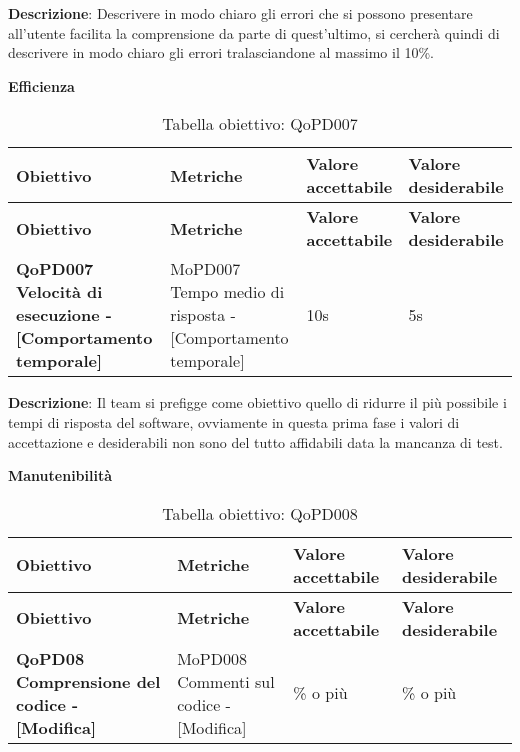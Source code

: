 \documentclass[../piano-di-qualifica.tex]{subfiles}
\begin{document}
\textbf{Descrizione}: Descrivere in modo chiaro gli errori che si possono presentare all'utente facilita la comprensione da parte di quest'ultimo, si cercherà quindi di descrivere in modo chiaro gli errori tralasciandone al massimo il 10\%.


    \begin{center}
        \centering
        \textbf{Efficienza}
    \end{center}

    \renewcommand{\arraystretch}{2} %
    \begin{longtable}[H]{>{\centering\bfseries}m{5cm} >{\centering}m{5cm} >{\centering}m{2.5cm} >{\centering\arraybackslash}m{2.5cm}}  
        \caption{Tabella obiettivo: QoPD007}%
        \label{tab:obiettivo_qopd007} \\
      \rowcolor{lightgray}
      {\textbf{Obiettivo}} & {\textbf{Metriche}} & {\textbf{Valore accettabile}} & {\textbf{Valore desiderabile}}  \\
      \endfirsthead%
      \rowcolor{lightgray}
      {\textbf{Obiettivo}} & {\textbf{Metriche}} & {\textbf{Valore accettabile}} & {\textbf{Valore desiderabile}}  \\
      \endhead%
      \textbf{QoPD007 Velocità di esecuzione - {[}Comportamento temporale{]}} & MoPD007 Tempo medio di risposta - {[}Comportamento temporale{]} & 10s & 5s \\
    \end{longtable}
    
    \textbf{Descrizione}: Il team si prefigge come obiettivo quello di ridurre il più possibile i tempi di risposta del software, ovviamente in questa prima fase i valori di accettazione e desiderabili non sono del tutto affidabili data la mancanza di test.    
        
    \begin{center}
        \centering
        \textbf{Manutenibilità}
    \end{center}

    \renewcommand{\arraystretch}{2} %
    \begin{longtable}[H]{>{\centering\bfseries}m{5cm} >{\centering}m{5cm} >{\centering}m{2.5cm} >{\centering\arraybackslash}m{2.5cm}}  
        \caption{Tabella obiettivo: QoPD008}%
        \label{tab:obiettivo_qopd008} \\
      \rowcolor{lightgray}
      {\textbf{Obiettivo}} & {\textbf{Metriche}} & {\textbf{Valore accettabile}} & {\textbf{Valore desiderabile}}  \\
      \endfirsthead%
      \rowcolor{lightgray}
      {\textbf{Obiettivo}} & {\textbf{Metriche}} & {\textbf{Valore accettabile}} & {\textbf{Valore desiderabile}}  \\
      \endhead%
      \textbf{QoPD08 Comprensione del codice - {[}Modifica{]}} & MoPD008 Commenti sul codice - {[}Modifica{]} & 10\% o più & 20\% o più \\
    \end{longtable}
    
\end{document}
